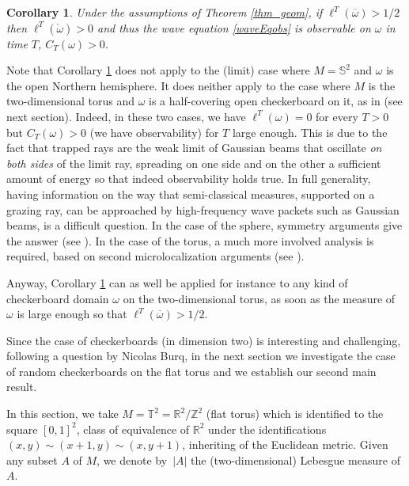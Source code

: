 \documentclass[10pt]{amsart}
\def\R{\mathbb{R}}
\def\Z{\mathbb{Z}}
\newtheorem{corollary}{Corollary}
\theoremstyle{definition}
\begin{document}
\begin{corollary} \label{cor_geom}
Under the assumptions of Theorem \ref{thm_geom}, if $\ell^T(\overline\omega) >1/2$ then $\ell^T(\mathring{\omega})>0$ and thus the wave equation \eqref{waveEqobs} is observable on $\omega$ in time $T$, \ie $C_T(\omega)>0$.
\end{corollary}

Note that Corollary \ref{cor_geom} does not apply to the (limit) case where $M=\mathbb{S}^2$ and $\omega$ is the open Northern hemisphere. It does neither apply to the case where $M$ is the two-dimensional torus and $\omega$ is a half-covering open checkerboard on it, as in \cite{Burq2017,BurqGerard2018} (see next section). Indeed, in these two cases, we have $\ell^T(\omega)=0$ for every $T>0$ but $C_T(\omega)>0$ (\ie we have observability) for $T$ large enough. This is due to the fact that trapped rays are the weak limit of Gaussian beams that oscillate \emph{on both sides} of the limit ray, spreading on one side and on the other a sufficient amount of energy so that indeed observability holds true. In full generality, having information on the way that semi-classical measures, supported on a grazing ray, can be approached by high-frequency wave packets such as Gaussian beams, is a difficult question. In the case of the sphere, symmetry arguments give the answer (see \cite{Lebeau_JEDP1992}). In the case of the torus, a much more involved analysis is required, based on second microlocalization arguments (see \cite{Burq2017,BurqGerard2018}).

Anyway, Corollary \ref{cor_geom} can as well be applied for instance to any kind of checkerboard domain $\omega$ on the two-dimensional torus, as soon as the measure of $\omega$ is large enough so that $\ell^T(\overline\omega)>1/2$.

Since the case of checkerboards (in dimension two) is interesting and challenging, following a question by Nicolas Burq, in the next section we investigate the case of random checkerboards on the flat torus and we establish our second main result.

In this section, we take $M=\mathbb{T}^2= \R^2/ \Z^2$ (flat torus) which is identified to the square $[0,1]^2$, class of equivalence of $\R^2$ under the identifications $(x,y)\sim(x+1,y)\sim(x,y+1)$, inheriting of the Euclidean metric.
Given any subset $A$ of $M$, we denote by~$|A|$ the (two-dimensional) Lebesgue measure of $A$.
\end{document}
